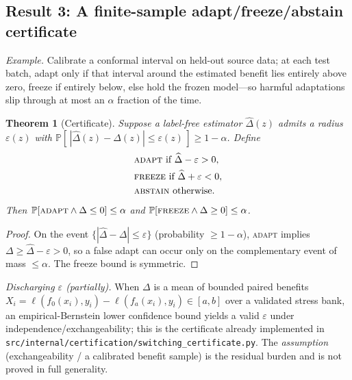 \documentclass[conference]{IEEEtran}
\theoremstyle{plain}
\newtheorem{theorem}{Theorem}
\theoremstyle{definition}
\renewcommand{\Pr}{\mathbb{P}}
\begin{document}
\subsection{Result 3: A finite-sample adapt/freeze/abstain certificate}\label{sec:cert}
\noindent\emph{Example.} Calibrate a conformal interval on held-out source data; at each test
batch, adapt only if that interval around the estimated benefit lies entirely above zero, freeze
if entirely below, else hold the frozen model---so harmful adaptations slip through at most an
$\alpha$ fraction of the time.
\begin{theorem}[Certificate]\label{thm:cert}
Suppose a label-free estimator $\widehat\Delta(z)$ admits a radius $\varepsilon(z)$ with
$\Pr[\,|\widehat\Delta(z)-\Delta(z)|\le \varepsilon(z)\,]\ge 1-\alpha$. Define
\[
\begin{aligned}
&\textsc{adapt}\ \text{if}\ \widehat\Delta-\varepsilon>0,\\
&\textsc{freeze}\ \text{if}\ \widehat\Delta+\varepsilon<0,\\
&\textsc{abstain}\ \text{otherwise.}
\end{aligned}
\]
Then $\Pr[\textsc{adapt}\wedge \Delta\le 0]\le\alpha$ and
$\Pr[\textsc{freeze}\wedge \Delta\ge 0]\le\alpha$.
\end{theorem}
\begin{proof}
On the event $\{|\widehat\Delta-\Delta|\le\varepsilon\}$ (probability $\ge1-\alpha$),
\textsc{adapt} implies $\Delta\ge\widehat\Delta-\varepsilon>0$, so a false adapt can
occur only on the complementary event of mass $\le\alpha$. The freeze bound is
symmetric. \qedhere
\end{proof}
\noindent\emph{Discharging $\varepsilon$ (partially).} When $\Delta$ is a mean of
bounded paired benefits $X_i=\ell(f_0(x_i),y_i)-\ell(f_a(x_i),y_i)\in[a,b]$ over a
validated stress bank, an empirical-Bernstein lower confidence bound yields a valid
$\varepsilon$ under independence/exchangeability; this is the certificate already
implemented in \texttt{src/internal/certification/switching\_certificate.py}. The
\emph{assumption} (exchangeability / a calibrated benefit sample) is the residual
burden and is not proved in full generality.
\end{document}
